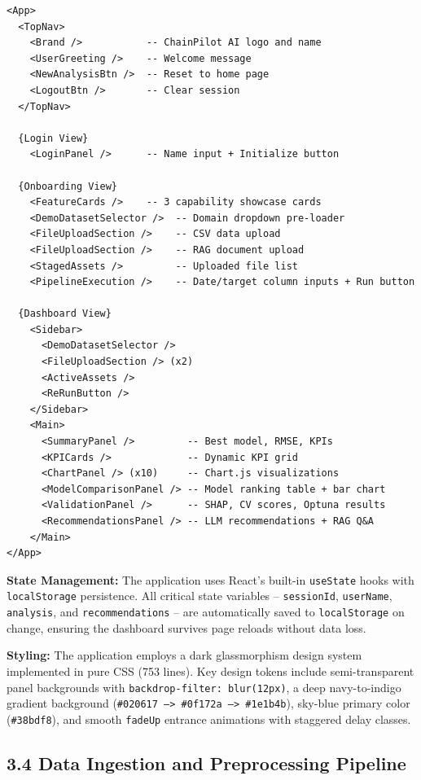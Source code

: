 \documentclass[12pt, a4paper]{report}
\begin{document}
\begin{verbatim}
<App>
  <TopNav>
    <Brand />           -- ChainPilot AI logo and name
    <UserGreeting />    -- Welcome message
    <NewAnalysisBtn />  -- Reset to home page
    <LogoutBtn />       -- Clear session
  </TopNav>

  {Login View}
    <LoginPanel />      -- Name input + Initialize button

  {Onboarding View}
    <FeatureCards />    -- 3 capability showcase cards
    <DemoDatasetSelector />  -- Domain dropdown pre-loader
    <FileUploadSection />    -- CSV data upload
    <FileUploadSection />    -- RAG document upload
    <StagedAssets />         -- Uploaded file list
    <PipelineExecution />    -- Date/target column inputs + Run button

  {Dashboard View}
    <Sidebar>
      <DemoDatasetSelector />
      <FileUploadSection /> (x2)
      <ActiveAssets />
      <ReRunButton />
    </Sidebar>
    <Main>
      <SummaryPanel />         -- Best model, RMSE, KPIs
      <KPICards />             -- Dynamic KPI grid
      <ChartPanel /> (x10)     -- Chart.js visualizations
      <ModelComparisonPanel /> -- Model ranking table + bar chart
      <ValidationPanel />      -- SHAP, CV scores, Optuna results
      <RecommendationsPanel /> -- LLM recommendations + RAG Q&A
    </Main>
</App>
\end{verbatim}


\textbf{State Management:} The application uses React's built-in \texttt{useState} hooks with \texttt{localStorage} persistence. All critical state variables -- \texttt{sessionId}, \texttt{userName}, \texttt{analysis}, and \texttt{recommendations} -- are automatically saved to \texttt{localStorage} on change, ensuring the dashboard survives page reloads without data loss.

\textbf{Styling:} The application employs a dark glassmorphism design system implemented in pure CSS (753 lines). Key design tokens include semi-transparent panel backgrounds with \texttt{backdrop-filter: blur(12px)}, a deep navy-to-indigo gradient background (\texttt{\#020617 --> \#0f172a --> \#1e1b4b}), sky-blue primary color (\texttt{\#38bdf8}), and smooth \texttt{fadeUp} entrance animations with staggered delay classes.

\subsection{3.4 Data Ingestion and Preprocessing Pipeline}
\end{document}
